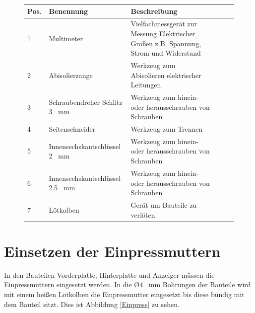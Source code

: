 \begin{figure}[H]
	\begin{center}
		\fontsize{8}{10}\selectfont
		\begin{tabularx}{\textwidth}{|p{0.4cm}|p{3.4cm}|X|X|X|X|} 
			\hline 
			\textbf{Pos.} &  \textbf{Benennung} &  \textbf{Beschreibung}\\ \hline
			1 & Multimeter & Vielfachmessgerät zur Messung Elektrischer Größen z.B. Spannung, Strom und Widerstand  \\ \hline
			2 & Abisolierzange & Werkzeug zum Abisolieren elektrischer Leitungen  \\ \hline
			3 & Schraubendreher Schlitz 3 \ mm & Werkzeug zum hinein- oder herausschrauben von Schrauben \\ \hline
			4 & Seitenschneider & Werkzeug zum Trennen  \\ \hline
			5 & Innensechskantschlüssel 2 \ mm &  Werkzeug zum hinein- oder herausschrauben von Schrauben \\ \hline
			6 & Innensechskantschlüssel 2.5 \ mm &  Werkzeug zum hinein- oder herausschrauben von Schrauben \\ \hline
			7 & Lötkolben &  Gerät um Bauteile zu verlöten \\ \hline

		\end{tabularx}
			\label{WerkTab}
	\end{center}
\end{figure}

\section{Einsetzen der Einpressmuttern}
In den Bauteilen Vorderplatte, Hinterplatte und Anzeiger müssen die Einpressmuttern eingesetzt werden. In die \O 4 \ mm Bohrungen der Bauteile wird mit einem heißen Lötkolben die Einpressmutter eingesetzt bis diese bündig mit dem Bauteil sitzt. Dies ist Abbildung \ref{Einpress} zu sehen.

